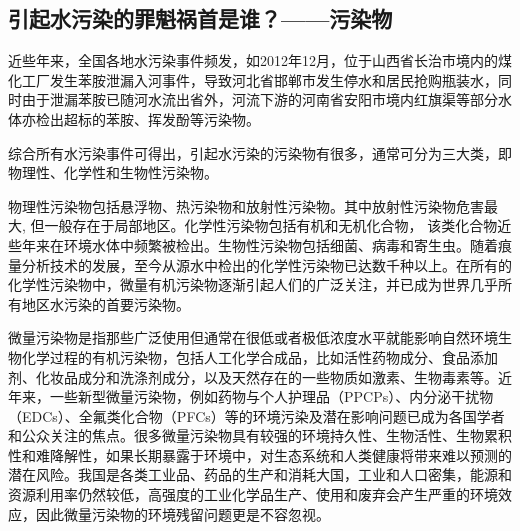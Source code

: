 \documentclass[]{book}
\begin{document}
\hypertarget{ux5f15ux8d77ux6c34ux6c61ux67d3ux7684ux7f6aux9b41ux7978ux9996ux662fux8c01ux6c61ux67d3ux7269}{%
\subsection{引起水污染的罪魁祸首是谁？------污染物}\label{ux5f15ux8d77ux6c34ux6c61ux67d3ux7684ux7f6aux9b41ux7978ux9996ux662fux8c01ux6c61ux67d3ux7269}}

近些年来，全国各地水污染事件频发，如2012年12月，位于山西省长治市境内的煤化工厂发生苯胺泄漏入河事件，导致河北省邯郸市发生停水和居民抢购瓶装水，同时由于泄漏苯胺已随河水流出省外，河流下游的河南省安阳市境内红旗渠等部分水体亦检出超标的苯胺、挥发酚等污染物。

综合所有水污染事件可得出，引起水污染的污染物有很多，通常可分为三大类，即物理性、化学性和生物性污染物。

物理性污染物包括悬浮物、热污染物和放射性污染物。其中放射性污染物危害最大, 但一般存在于局部地区。化学性污染物包括有机和无机化合物， 该类化合物近些年来在环境水体中频繁被检出。生物性污染物包括细菌、病毒和寄生虫。随着痕量分析技术的发展，至今从源水中检出的化学性污染物已达数千种以上。在所有的化学性污染物中，微量有机污染物逐渐引起人们的广泛关注，并已成为世界几乎所有地区水污染的首要污染物。

微量污染物是指那些广泛使用但通常在很低或者极低浓度水平就能影响自然环境生物化学过程的有机污染物，包括人工化学合成品，比如活性药物成分、食品添加剂、化妆品成分和洗涤剂成分，以及天然存在的一些物质如激素、生物毒素等。近年来，一些新型微量污染物，例如药物与个人护理品（PPCPs）、内分泌干扰物（EDCs）、全氟类化合物（PFCs）等的环境污染及潜在影响问题已成为各国学者和公众关注的焦点。很多微量污染物具有较强的环境持久性、生物活性、生物累积性和难降解性，如果长期暴露于环境中，对生态系统和人类健康将带来难以预测的潜在风险。我国是各类工业品、药品的生产和消耗大国，工业和人口密集，能源和资源利用率仍然较低，高强度的工业化学品生产、使用和废弃会产生严重的环境效应，因此微量污染物的环境残留问题更是不容忽视。
\end{document}
